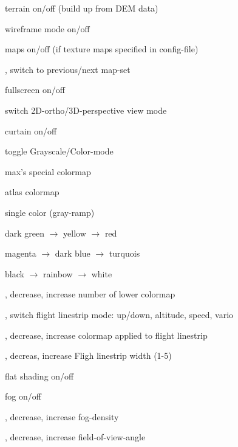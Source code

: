 \begin{hkkeys}
\item[\keys{l}]        terrain on/off (build up from DEM data)
\item[\keys{L}]        wireframe mode on/off
\item[\keys{b}]        maps on/off (if texture maps specified in config-file)
\item[\keys{x}, \keys{c}] 	switch to previous/next map-set
\item[\keys{w}]        fullscreen on/off
\item[\keys{o}]        switch 2D-ortho/3D-perspective view mode
\item[\keys{h}]        curtain on/off
\item[\keys{B}]        toggle Grayscale/Color-mode

\item[\keys{1}]  max's special colormap
\item[\keys{2}]  atlas colormap
\item[\keys{3}]  single color (gray-ramp)
\item[\keys{4}]  dark green $\rightarrow$ yellow $\rightarrow$ red
\item[\keys{5}]  magenta $\rightarrow$ dark blue $\rightarrow$ turquois
\item[\keys{6}]  black $\rightarrow$ rainbow $\rightarrow$ white

\item[\keys{F10}, \keys{F11}] decrease, increase number of lower colormap

\item[\keys{\shift+F5}, \keys{\shift+F6}]
        switch flight linestrip mode: up/down, altitude, speed, vario

\item[\keys{\shift+F7}, \keys{\shift+F8}]
        decrease, increase colormap applied to flight linestrip

\item[\keys{\shift+F3}, \keys{\shift+F4}]
        decreas, increase Fligh linestrip width (1-5)



\item[\keys{O}]        flat shading on/off
\item[\keys{j}]        fog on/off
\item[\keys{9}, \keys{0}]      decrease, increase fog-density
\item[\keys{7}, \keys{8}]      decrease, increase field-of-view-angle


\end{hkkeys}
